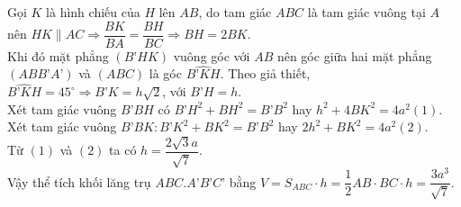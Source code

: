 \begin{ex}
{{}
		\noindent	Gọi $K$ là hình chiếu của $H$ lên $AB$, do tam giác $ABC$ là tam giác vuông tại $A$ nên $HK\parallel AC\Rightarrow\dfrac{BK}{BA}=\dfrac{BH}{BC}\Rightarrow BH=2BK$.\\
		Khi đó mặt phẳng $(B’HK)$ vuông góc với $AB$ nên góc giữa hai mặt phẳng $(ABB’A’)$ và $(ABC)$ là góc $\widehat{B’KH}$. Theo giả thiết, $\widehat{B’KH}=45^{\circ}\Rightarrow B’K=h\sqrt{2}$, với $B’H=h$.\\
		Xét tam giác vuông $B’BH$ có $B’H^2+BH^2=B’B^2$ hay $h^2+4BK^2=4a^2(1)$.\\
		Xét tam giác vuông $B’BK\colon B’K^2+BK^2=B’B^2$ hay $2h^2+BK^2=4a^2(2)$.\\
		Từ $(1)$ và $(2)$ ta có $h=\dfrac{2\sqrt{3}a}{\sqrt{7}}$.\\
		Vậy thể tích khối lăng trụ $ABC.A’B’C’$ bằng $V=S_{ABC}\cdot h=\dfrac{1}{2}AB\cdot BC\cdot h=\dfrac{3a^3}{\sqrt{7}}$.}
\end{ex}
